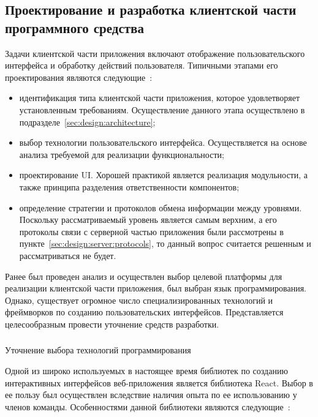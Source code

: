 \subsection{Проектирование и разработка клиентской части программного средства}
\label{sec:design:client}

Задачи клиентской части приложения включают отображение пользовательского интерфейса и обработку действий пользователя.
Типичными этапами его проектирования являются следующие~\cite{application_architecture_guide}:

\begin{itemize}
  \item идентификация типа клиентской части приложения, которое удовлетворяет установленным требованиям.
  Осуществление данного этапа осуществлено в подразделе~\ref{sec:design:architecture};
  \item выбор технологии пользовательского интерфейса. Осуществляется на основе анализа требуемой для реализации
  функциональности;
  \item проектирование UI. Хорошей практикой является реализация модульности, а также принципа разделения 
  ответственности компонентов;
  \item определение стратегии и протоколов обмена информации между уровнями. Поскольку рассматриваемый уровень является
  самым верхним, а его протоколы связи с серверной частью приложения были рассмотрены в
  пункте~\ref{sec:design:server:protocols}, то данный вопрос считается решенным и рассматриваться не будет.
\end{itemize}

Ранее был проведен анализ и осуществлен выбор целевой платформы для реализации клиентской части приложения, был выбран
язык программирования. Однако, существует огромное число специализированных технологий и фреймворков по созданию
пользовательских интерфейсов. Представляется целесообразным провести уточнение средств разработки.

\subsubsection{} Уточнение выбора технологий программирования
\label{sec:design:client:technologies}

Одной из широко используемых в настоящее время библиотек по созданию интерактивных интерфейсов веб-приложения является
библиотека React. Выбор в ее пользу был осуществлен вследствие наличия опыта по ее использованию у членов команды.
Особенностями данной библиотеки являются следующие~\cite{habr_react_introduction}:

